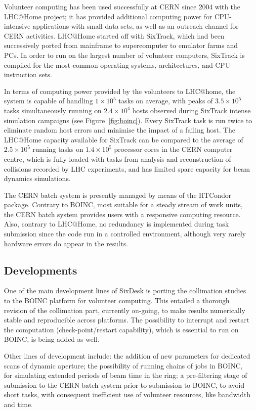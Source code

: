 \documentclass{ws-ijmpa}
\begin{document}
Volunteer computing has been used successfully at CERN since 2004 with the LHC@Home project; it has provided additional computing power for CPU-intensive applications with small data sets, as well as an outreach channel for CERN activities. LHC@Home started off with SixTrack, which had been successively ported from mainframe to supercomputer to emulator farms and PCs. In order to run on the largest number of volunteer computers, SixTrack is compiled for the most common operating systems, architectures, and CPU instruction sets.

In terms of computing power provided by the volunteers to LHC@home, the system is capable of handling $1\times 10^5$ tasks on average, with peaks of $3.5 \times 10^5$ tasks simultaneously running on $2.4 \times 10^4$ hosts observed during SixTrack intense simulation campaigns (see Figure~\ref{fig:boinc}). Every SixTrack task is run twice to eliminate random host errors and minimise the impact of a failing host. The LHC@Home capacity available for SixTrack can be compared to the average of $2.5 \times 10^5$ running tasks on $1.4 \times 10^5$ processor cores in the CERN computer centre, which is fully loaded with tasks from analysis and reconstruction of collisions recorded by LHC experiments, and has limited spare capacity for beam dynamics simulations.

The CERN batch system is presently managed by means of the HTCondor~\cite{HTCondor} package. Contrary to BOINC, most suitable for a steady stream of work units, the CERN batch system provides users with a responsive computing resource. Also, contrary to LHC@Home, no redundancy is implemented during task submission since the code run in a controlled environment, although very rarely hardware errors do appear in the results.

\subsection{Developments}

One of the main development lines of SixDesk is porting the collimation studies to the BOINC platform for volunteer computing. This entailed a thorough revision of the collimation part, currently on-going, to make results numerically stable and reproducible across platforms. The possibility to interrupt and restart the computation (check-point/restart capability), which is essential to run on BOINC,  is being added as well.

Other lines of development include: the addition of new parameters for dedicated scans of dynamic aperture; the possibility of running chains of jobs in BOINC, for simulating extended periods of beam time in the ring; a pre-filtering stage of submission to the CERN batch system prior to submission to BOINC, to avoid short tasks, with consequent inefficient use of volunteer resources, like bandwidth and time.
\end{document}
